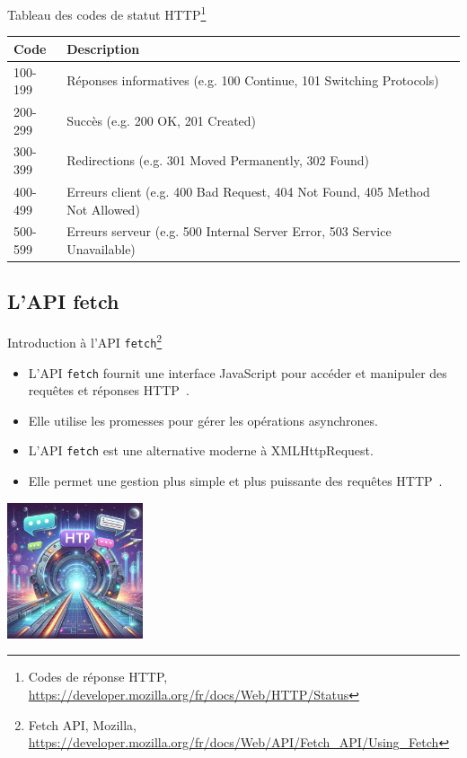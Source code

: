 \documentclass{beamer}
\begin{document}
    \begin{frame}{Tableau des codes de statut HTTP\footnote{Codes de réponse HTTP, \url{https://developer.mozilla.org/fr/docs/Web/HTTP/Status}}}
        \begin{tabular}{|p{1.5cm}|p{9.5cm}|}
            \hline
            \textbf{Code} & \textbf{Description}                                                         \\
            \hline
            100-199       & Réponses informatives (e.g. 100 Continue, 101 Switching Protocols)           \\
            \hline
            200-299       & Succès (e.g. 200 OK, 201 Created)                                            \\
            \hline
            300-399       & Redirections (e.g. 301 Moved Permanently, 302 Found)                         \\
            \hline
            400-499       & Erreurs client (e.g. 400 Bad Request, 404 Not Found, 405 Method Not Allowed) \\
            \hline
            500-599       & Erreurs serveur (e.g. 500 Internal Server Error, 503 Service Unavailable)    \\
            \hline
        \end{tabular}
    \end{frame}

    \subsection{L'API fetch}\label{subsec:fetch-api}

    \begin{frame}{Introduction à l'API \lstinline{fetch}\footnote{\label{mozilla-fetch}Fetch API, Mozilla, \url{https://developer.mozilla.org/fr/docs/Web/API/Fetch_API/Using_Fetch}}}
        \begin{itemize}
            \item L'API \lstinline{fetch} fournit une interface JavaScript pour accéder et manipuler des requêtes et réponses HTTP~.
            \item Elle utilise les promesses pour gérer les opérations asynchrones.
            \item L'API \lstinline{fetch} est une alternative moderne à XMLHttpRequest.
            \item Elle permet une gestion plus simple et plus puissante des requêtes HTTP~.
        \end{itemize}
        \bigbreak
        \centering
        \includegraphics[width=4cm]{image/http-tunnel}
    \end{frame}
\end{document}
